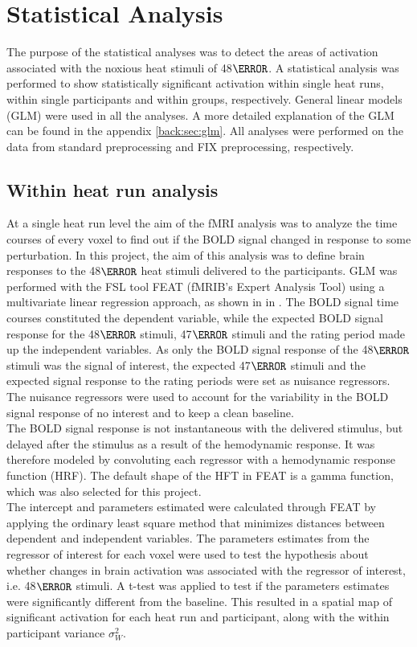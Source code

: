 \section{Statistical Analysis}\label{sec:stats}

The purpose of the statistical analyses was to detect the areas of activation associated with the noxious heat stimuli of 48$\degree$. A statistical analysis was performed to show statistically significant activation within single heat runs, within single participants and within groups, respectively. General linear models (GLM) were used in all the analyses. A more detailed explanation of the GLM can be found in the appendix \ref{back:sec:glm}. All analyses were performed on the data from standard preprocessing and FIX preprocessing, respectively.

\subsection{Within heat run analysis}
At a single heat run level the aim of the fMRI analysis was to analyze the time courses of every voxel to find out if the BOLD signal changed in response to some perturbation. In this project, the aim of this analysis was to define brain responses to the 48$\degree$ heat stimuli delivered to the participants. GLM was performed with the FSL tool FEAT (fMRIB’s Expert Analysis Tool) using a multivariate linear regression approach, as shown in  in . The BOLD signal time courses constituted the dependent variable, while the expected BOLD signal response for the 48$\degree$ stimuli, 47$\degree$ stimuli and the rating period made up the independent variables. As only the BOLD signal response of the 48$\degree$ stimuli was the signal of interest, the expected 47$\degree$ stimuli and the expected signal response to the rating periods were set as nuisance regressors. The nuisance regressors were used to account for the variability in the BOLD signal response of no interest and to keep a clean baseline. \\
The BOLD signal response is not instantaneous with the delivered stimulus, but delayed after the stimulus as a result of the hemodynamic response. It was therefore modeled by convoluting each regressor with a hemodynamic response function (HRF). The default shape of the HFT in FEAT is a  gamma function, which was also selected for this project. \\
The intercept and parameters estimated were calculated through FEAT by applying the ordinary least square method that minimizes distances between dependent and independent variables. The parameters estimates from the regressor of interest for each voxel were used to test the hypothesis about whether changes in brain activation was associated with the regressor of interest, i.e. 48$\degree$ stimuli. A t-test was applied to test if the parameters estimates were significantly different from the baseline. This resulted in a spatial map of significant activation for each heat run and participant, along with the within participant variance $\sigma_{W}^{2}$. \\
